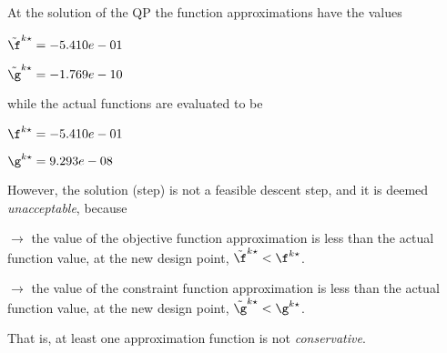 At the solution of the QP the function approximations have the values

$\tilde \f^{k\star} = -5.410e-01$

$\tilde \g^{k\star} = -1.769e-10$

\bigskip
while the actual functions are evaluated to be

$\f^{k\star} = -5.410e-01$

$\g^{k\star} =  9.293e-08$

\bigskip
 However, the solution (step)                         is not a feasible descent step, and it is deemed                         \emph{unacceptable}, because 
 
$\to$ the value of the objective                             function approximation is less than the actual function                             value, at the new design point,                             $\tilde {\f}^{k\star} < {\f}^{k\star}$.

 $\to$ the value of the constraint function                             approximation is less than the actual function value, at                             the new design point, $\tilde {\g}^{k\star} < {\g}^{k\star}$.

 \bigskip 

 That is, at least one approximation                         function is not \emph{conservative}.
